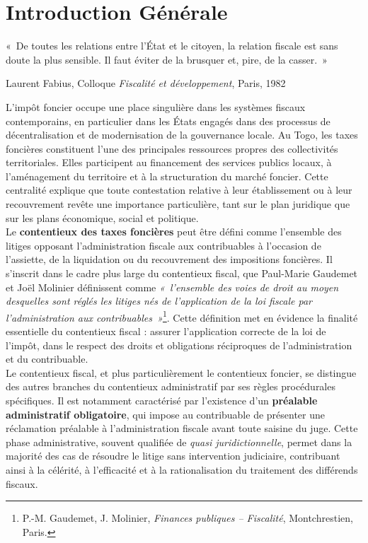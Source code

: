 \documentclass[Cours_contentieuxTF2026.tex]{subfiles}
\begin{document}
\chapter*{Introduction Générale}

\epigraph{%
	«~De toutes les relations entre l’État et le citoyen, la relation fiscale est sans doute la plus sensible. 
	Il faut éviter de la brusquer et, pire, de la casser.~»
}{Laurent Fabius, Colloque \textit{Fiscalité et développement}, Paris, 1982}

L’impôt foncier occupe une place singulière dans les systèmes fiscaux contemporains, 
en particulier dans les États engagés dans des processus de décentralisation et de modernisation 
de la gouvernance locale. Au Togo, les taxes foncières constituent l’une des principales ressources 
propres des collectivités territoriales. Elles participent au financement des services publics locaux, 
à l’aménagement du territoire et à la structuration du marché foncier. Cette centralité explique que 
toute contestation relative à leur établissement ou à leur recouvrement revête une importance 
particulière, tant sur le plan juridique que sur les plans économique, social et politique.\\

\noindent Le \textbf{contentieux des taxes foncières} peut être défini comme l’ensemble des litiges opposant 
l’administration fiscale aux contribuables à l’occasion de l’assiette, de la liquidation ou du 
recouvrement des impositions foncières. Il s’inscrit dans le cadre plus large du contentieux fiscal, 
que Paul-Marie Gaudemet et Joël Molinier définissent comme 
\emph{«~l’ensemble des voies de droit au moyen desquelles sont réglés les litiges nés de l’application 
	de la loi fiscale par l’administration aux contribuables~»}\footnote{P.-M. Gaudemet, J. Molinier, 
	\textit{Finances publiques -- Fiscalité}, Montchrestien, Paris.}. 
Cette définition met en évidence la finalité essentielle du contentieux fiscal : assurer l’application 
correcte de la loi de l’impôt, dans le respect des droits et obligations réciproques de l’administration 
et du contribuable.\\

\noindent Le contentieux fiscal, et plus particulièrement le contentieux foncier, se distingue des autres 
branches du contentieux administratif par ses règles procédurales spécifiques. Il est notamment 
caractérisé par l’existence d’un \textbf{préalable administratif obligatoire}, qui impose au contribuable 
de présenter une réclamation préalable à l’administration fiscale avant toute saisine du juge. 
Cette phase administrative, souvent qualifiée de \emph{quasi juridictionnelle}, permet dans la majorité 
des cas de résoudre le litige sans intervention judiciaire, contribuant ainsi à la célérité, à 
l’efficacité et à la rationalisation du traitement des différends fiscaux.\\
\end{document}
